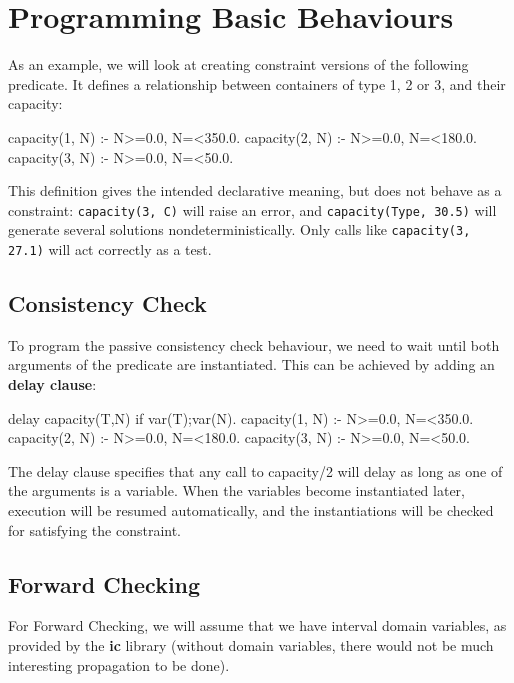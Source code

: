 \section{Programming Basic Behaviours}

As an example, we will look at creating constraint versions of the
following predicate.
It defines a relationship between containers of type 1, 2 or 3,
and their capacity:
\begin{code}
capacity(1, N) :- N>=0.0, N=<350.0.
capacity(2, N) :- N>=0.0, N=<180.0.
capacity(3, N) :- N>=0.0, N=<50.0.
\end{code}
This definition gives the intended declarative meaning,
but does not behave as a constraint:
{\tt capacity(3, C)} will raise an error, and
{\tt capacity(Type, 30.5)} will generate several solutions nondeterministically.
Only calls like {\tt capacity(3, 27.1)} will act correctly as a test.


\subsection{Consistency Check}

To program the passive consistency check behaviour, we need to wait until
both arguments of the predicate are instantiated.
This can be achieved by adding an \eclipse{} {\bf delay clause}:
\begin{code}
delay capacity(T,N) if var(T);var(N).
capacity(1, N) :- N>=0.0, N=<350.0.
capacity(2, N) :- N>=0.0, N=<180.0.
capacity(3, N) :- N>=0.0, N=<50.0.
\end{code}
The delay clause specifies that any call to capacity/2 will delay as long
as one of the arguments is a variable. When the variables become instantiated
later, execution will be resumed automatically, and 
the instantiations will be checked for satisfying the constraint.


\subsection{Forward Checking}

For Forward Checking, we will assume that we have interval domain variables,
as provided by the {\bf ic} library (without domain variables, there would
not be much interesting propagation to be done).

